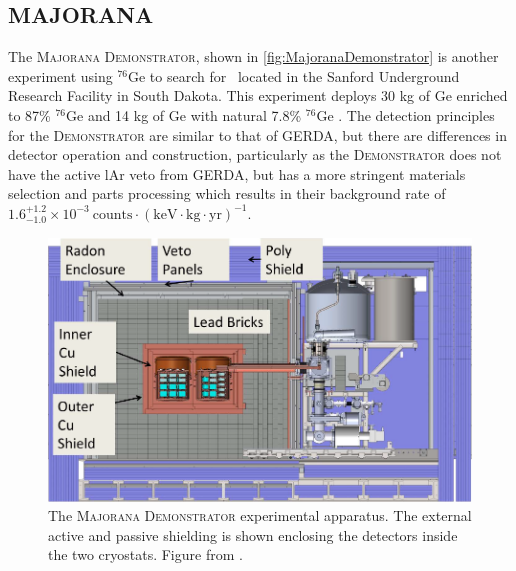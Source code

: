 \subsection{MAJORANA}
The \textsc{Majorana Demonstrator}, shown in \autoref{fig:MajoranaDemonstrator} is another experiment using $^{76}$Ge to search for \zeronubb~located in the Sanford Underground Research Facility in South Dakota.
This experiment deploys 30 kg of Ge enriched to 87\% $^{76}$Ge and 14 kg of Ge with natural 7.8\% $^{76}$Ge \cite{1742-6596-606-1-012004}.
The detection principles for the \textsc{Demonstrator} are similar to that of GERDA, but there are differences in detector operation and construction, particularly as the \textsc{Demonstrator} does not have the active lAr veto from GERDA, but has a more stringent materials selection and parts processing which results in their background rate of $1.6^{+1.2}_{-1.0}\times10^{-3} ~\textrm{counts}\cdot(\textrm{keV}\cdot \textrm{kg} \cdot \textrm{yr})^{-1}$.
\begin{figure}
    \centering
    \includegraphics[width=0.8\linewidth]{Figures/MajoranaDemonstrator.png}
    \caption[The \textsc{Majorana Demonstrator} experimental apparatus.]
    {The \textsc{Majorana Demonstrator} experimental apparatus.
    The external active and passive shielding is shown enclosing the detectors inside the two cryostats.
    Figure from \cite{1742-6596-606-1-012004}.}
    \label{fig:MajoranaDemonstrator}
\end{figure}
